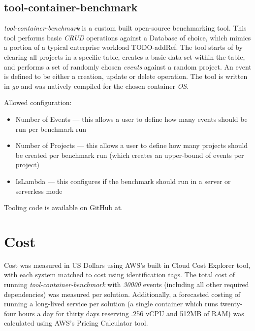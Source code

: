 \subsection{tool-container-benchmark}
\textit{tool-container-benchmark} is a custom built open-source benchmarking tool. This tool performs basic \emph{CRUD} operations against a Database of choice,
which mimics a portion of a typical enterprise workload TODO-addRef. The tool starts of by clearing all projects in a specific table, creates a basic data-set within the table,
and performs a set of randomly chosen \textit{events} against a random project. An event is defined to be either a creation, update or delete operation.
The tool is written in \emph{go}\cite{go} and was natively compiled for the chosen container \emph{OS}. 

Allowed configuration:
\begin{itemize}
  \item Number of Events --- this allows a user to define how many events should be run per benchmark run
  \item Number of Projects --- this allows a user to define how many projects should be created per benchmark run (which creates an upper-bound of events per project)
  \item IsLambda --- this configures if the benchmark should run in a server or serverless mode
\end{itemize}

Tooling code is available on GitHub at\cite{tool_container_benchmark}.

\section{Cost}
Cost was measured in US Dollars using AWS's built in Cloud Cost Explorer tool\cite{blocher_juras_smith_2022}, with each system matched to cost using identification tags.
The total cost of running \textit{tool-container-benchmark} with \textit{30000} events (including all other required dependencies)
was measured per solution.
Additionally, a forecasted costing of running a long-lived service per solution (a single container which runs twenty-four hours a day for thirty days reserving .256 vCPU and 512MB of RAM)
was calculated using AWS's Pricing Calculator\cite{venning_2020} tool.

